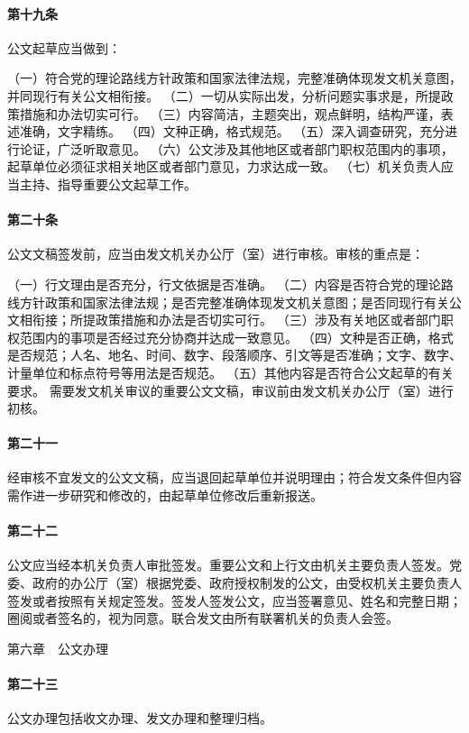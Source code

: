 \documentclass{gbt9704}
\begin{document}
\paragraph{第十九条}
公文起草应当做到：

（一）符合党的理论路线方针政策和国家法律法规，完整准确体现发文机关意图，并同现行有关公文相衔接。
（二）一切从实际出发，分析问题实事求是，所提政策措施和办法切实可行。
（三）内容简洁，主题突出，观点鲜明，结构严谨，表述准确，文字精练。
（四）文种正确，格式规范。
（五）深入调查研究，充分进行论证，广泛听取意见。
（六）公文涉及其他地区或者部门职权范围内的事项，起草单位必须征求相关地区或者部门意见，力求达成一致。
（七）机关负责人应当主持、指导重要公文起草工作。
\paragraph{第二十条}
公文文稿签发前，应当由发文机关办公厅（室）进行审核。审核的重点是：

（一）行文理由是否充分，行文依据是否准确。
（二）内容是否符合党的理论路线方针政策和国家法律法规；是否完整准确体现发文机关意图；是否同现行有关公文相衔接；所提政策措施和办法是否切实可行。
（三）涉及有关地区或者部门职权范围内的事项是否经过充分协商并达成一致意见。
（四）文种是否正确，格式是否规范；人名、地名、时间、数字、段落顺序、引文等是否准确；文字、数字、计量单位和标点符号等用法是否规范。
（五）其他内容是否符合公文起草的有关要求。
需要发文机关审议的重要公文文稿，审议前由发文机关办公厅（室）进行初核。
\paragraph{第二十一}经审核不宜发文的公文文稿，应当退回起草单位并说明理由；符合发文条件但内容需作进一步研究和修改的，由起草单位修改后重新报送。

\paragraph{第二十二}公文应当经本机关负责人审批签发。重要公文和上行文由机关主要负责人签发。党委、政府的办公厅（室）根据党委、政府授权制发的公文，由受权机关主要负责人签发或者按照有关规定签发。签发人签发公文，应当签署意见、姓名和完整日期；圈阅或者签名的，视为同意。联合发文由所有联署机关的负责人会签。


第六章　公文办理


\paragraph{第二十三}公文办理包括收文办理、发文办理和整理归档。
\end{document}
